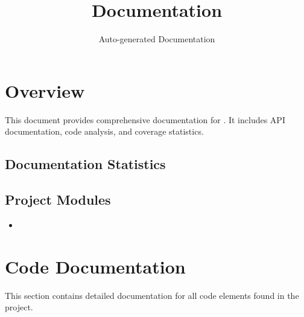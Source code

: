 \documentclass[11pt,a4paper]{article}
\title{\VAR{project_name}\\Documentation}
\author{Auto-generated Documentation}
\date{\VAR{generation_date}}
\begin{document}
\maketitle
\thispagestyle{empty}

\newpage
\tableofcontents
\newpage

\section{Overview}

This document provides comprehensive documentation for \textbf{}. It includes API documentation, code analysis, and coverage statistics.

\subsection{Documentation Statistics}


\subsection{Project Modules}

\begin{itemize}
    \item \texttt{}
\end{itemize}

\section{Code Documentation}

This section contains detailed documentation for all code elements found in the project.

\subsection{}
\end{document}
